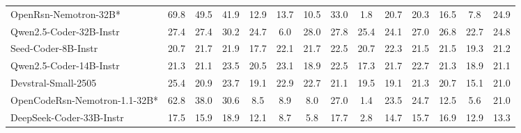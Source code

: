 \begin{table}[hbt]
{\begin{tabular}{l *{13}{c}}
\rowcolor{gray!10}
OpenRsn-Nemotron-32B*      & 69.8 & 49.5 & 41.9 & 12.9 & 13.7 & 10.5 & 33.0 & 1.8  & 20.7 & 20.3 & 16.5 & 7.8  & 24.9 \\
Qwen2.5-Coder-32B-Instr        & 27.4 & 27.4 & 30.2 & 24.7 & 6.0  & 28.0 & 27.8 & 25.4 & 24.1 & 27.0 & 26.8 & 22.7 & 24.8 \\
\rowcolor{gray!10}
Seed-Coder-8B-Instr            & 20.7 & 21.7 & 21.9 & 17.7 & 22.1 & 21.7 & 22.5 & 20.7 & 22.3 & 21.5 & 21.5 & 19.3 & 21.2 \\
Qwen2.5-Coder-14B-Instr        & 21.3 & 21.1 & 23.5 & 20.5 & 23.1 & 18.9 & 22.5 & 17.3 & 21.7 & 22.7 & 21.3 & 18.9 & 21.1 \\
\rowcolor{gray!10}
Devstral-Small-2505            & 25.4 & 20.9 & 23.7 & 19.1 & 22.9 & 22.7 & 21.1 & 19.5 & 19.1 & 21.3 & 20.7 & 15.1 & 21.0 \\
OpenCodeRsn-Nemotron-1.1-32B* & 62.8 & 38.0 & 30.6 & 8.5  & 8.9  & 8.0  & 27.0 & 1.4  & 23.5 & 24.7 & 12.5 & 5.6  & 21.0 \\
\rowcolor{gray!10}
DeepSeek-Coder-33B-Instr       & 17.5 & 15.9 & 18.9 & 12.1 & 8.7  & 5.8  & 17.7 & 2.8  & 14.7 & 15.7 & 16.9 & 12.9 & 13.3 \\

\bottomrule
\end{tabular}%
}
\end{table}
